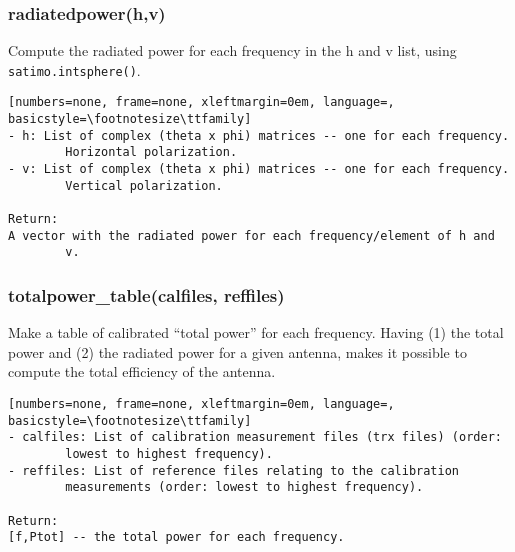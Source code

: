\subsubsection{radiatedpower(h,v)}
Compute the radiated power for each frequency in the h and v list, using
\texttt{satimo.intsphere()}.

\begin{lstlisting}[numbers=none, frame=none, xleftmargin=0em, language=, basicstyle=\footnotesize\ttfamily]
- h: List of complex (theta x phi) matrices -- one for each frequency.
        Horizontal polarization.
- v: List of complex (theta x phi) matrices -- one for each frequency.
        Vertical polarization.

Return:
A vector with the radiated power for each frequency/element of h and
        v.
\end{lstlisting}

\subsubsection{totalpower\_table(calfiles, reffiles)}
Make a table of calibrated ``total power'' for each frequency.
Having (1) the total power and (2) the radiated power for a given antenna,
makes it possible to compute the total efficiency of the antenna.

\begin{lstlisting}[numbers=none, frame=none, xleftmargin=0em, language=, basicstyle=\footnotesize\ttfamily]
- calfiles: List of calibration measurement files (trx files) (order:
        lowest to highest frequency).
- reffiles: List of reference files relating to the calibration
        measurements (order: lowest to highest frequency).

Return:
[f,Ptot] -- the total power for each frequency.
\end{lstlisting}

